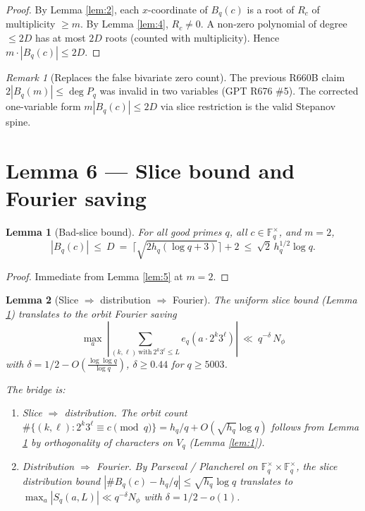 \documentclass[12pt]{amsart}
\newtheorem{lemma}{Lemma}
\theoremstyle{definition}
\theoremstyle{remark}
\newtheorem{remark}{Remark}
\begin{document}
\begin{proof}
By Lemma \ref{lem:2}, each $x$-coordinate of $B_q(c)$ is a root of $R_c$ of
multiplicity $\ge m$. By Lemma \ref{lem:4}, $R_c \ne 0$. A non-zero polynomial of
degree $\le 2D$ has at most $2D$ roots (counted with multiplicity). Hence
$m \cdot |B_q(c)| \le 2D$.
\end{proof}

\begin{remark}[Replaces the false bivariate zero count]
The previous R660B claim $2 |B_q(m)| \le \deg P_q$ was invalid in two variables
(GPT R676 \#5). The corrected one-variable form $m |B_q(c)| \le 2 D$ via slice
restriction is the valid Stepanov spine.
\end{remark}

\section{Lemma 6 --- Slice bound and Fourier saving}

\begin{lemma}[Bad-slice bound]\label{lem:6a}
For all good primes $q$, all $c \in \mathbb{F}_q^\times$, and $m = 2$,
$$
|B_q(c)|\ \le\ D\ =\ \lceil \sqrt{2 h_q (\log q + 3)} \rceil + 2\ \le\ \sqrt{2}\, h_q^{1/2} \log q.
$$
\end{lemma}

\begin{proof}
Immediate from Lemma \ref{lem:5} at $m = 2$.
\end{proof}

\begin{lemma}[Slice $\Rightarrow$ distribution $\Rightarrow$ Fourier]\label{lem:6b}
The uniform slice bound (Lemma \ref{lem:6a}) translates to the orbit Fourier saving
$$
\max_a\ \left|\sum_{(k, \ell)\ \text{with}\ 2^k 3^\ell \le L} e_q(a \cdot 2^k 3^\ell)\right|
\ \ll\ q^{-\delta}\, N_\phi
$$
with $\delta = 1/2 - O\!\left(\frac{\log \log q}{\log q}\right)$,
$\delta \ge 0.44$ for $q \ge 5003$.

The bridge is:
\begin{enumerate}
\item \emph{Slice $\Rightarrow$ distribution.} The orbit count
$\#\{(k, \ell) : 2^k 3^\ell \equiv c\pmod q\} = h_q/q + O(\sqrt{h_q}\log q)$
follows from Lemma \ref{lem:6a} by orthogonality of characters on $V_q$
(Lemma \ref{lem:1}).
\item \emph{Distribution $\Rightarrow$ Fourier.} By Parseval / Plancherel on
$\mathbb{F}_q^\times \times \mathbb{F}_q^\times$, the slice distribution bound
$|\#B_q(c) - h_q/q| \le \sqrt{h_q} \log q$ translates to
$\max_a |S_q(a, L)| \ll q^{-\delta} N_\phi$ with $\delta = 1/2 - o(1)$.
\end{enumerate}
\end{lemma}
\end{document}
